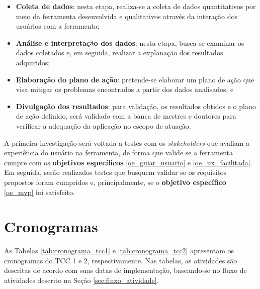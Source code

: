 \begin{itemize}
    \item \textbf{Coleta de dados}: nesta etapa, realiza-se a coleta de dados quantitativos por meio da ferramenta desenvolvida e qualitativos através da interação dos usuários com a ferramenta;
    \item \textbf{Análise e interpretação dos dados}: nesta etapa, busca-se examinar os dados coletados e, em seguida, realizar a explanação dos resultados adquiridos;
    \item \textbf{Elaboração do plano de ação}: pretende-se elaborar um plano de ação que visa mitigar os problemas encontrados a partir dos dados analisados, e 
    \item \textbf{Divulgação dos resultados}: para validação, os resultados obtidos e o plano de ação definido, será validado com a banca de mestres e doutores para verificar a adequação da aplicação no escopo de atuação.
\end{itemize}

A primeira investigação será voltada a testes com os \textit{stakeholders} que avaliam a experiência do usuário na ferramenta, de forma que valide se a ferramenta cumpre com os \textbf{objetivos específicos} \ref{oe_guiar_usuario} e \ref{oe_ux_facilitada}. Em seguida, serão realizados testes que busquem validar se os requisitos propostos foram cumpridos e, principalmente, se o \textbf{objetivo específico} \ref{oe_mvp} foi satisfeito.

\section{Cronogramas}

As Tabelas \ref{tab:cronograma_tcc1} e \ref{tab:cronograma_tcc2} apresentam os cronogramas do TCC 1 e 2, respectivamente. Nas tabelas, as atividades são descritas de acordo com suas datas de implementação, baseando-se no fluxo de atividades descrito na Seção \ref{sec:fluxo_atividade}.

